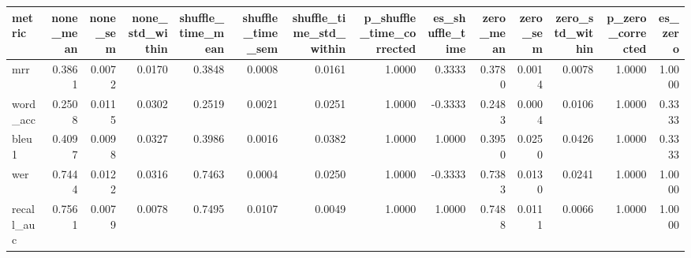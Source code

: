 \begin{tabular}{lrrrrrrrrrrrrr}
\toprule
metric & none_mean & none_sem & none_std_within & shuffle_time_mean & shuffle_time_sem & shuffle_time_std_within & p_shuffle_time_corrected & es_shuffle_time & zero_mean & zero_sem & zero_std_within & p_zero_corrected & es_zero \\
\midrule
mrr & 0.3861 & 0.0072 & 0.0170 & 0.3848 & 0.0008 & 0.0161 & 1.0000 & 0.3333 & 0.3780 & 0.0014 & 0.0078 & 1.0000 & 1.0000 \\
word_acc & 0.2508 & 0.0115 & 0.0302 & 0.2519 & 0.0021 & 0.0251 & 1.0000 & -0.3333 & 0.2483 & 0.0004 & 0.0106 & 1.0000 & 0.3333 \\
bleu1 & 0.4097 & 0.0098 & 0.0327 & 0.3986 & 0.0016 & 0.0382 & 1.0000 & 1.0000 & 0.3950 & 0.0250 & 0.0426 & 1.0000 & 0.3333 \\
wer & 0.7444 & 0.0122 & 0.0316 & 0.7463 & 0.0004 & 0.0250 & 1.0000 & -0.3333 & 0.7383 & 0.0130 & 0.0241 & 1.0000 & 1.0000 \\
recall_auc & 0.7561 & 0.0079 & 0.0078 & 0.7495 & 0.0107 & 0.0049 & 1.0000 & 1.0000 & 0.7488 & 0.0111 & 0.0066 & 1.0000 & 1.0000 \\
\bottomrule
\end{tabular}
